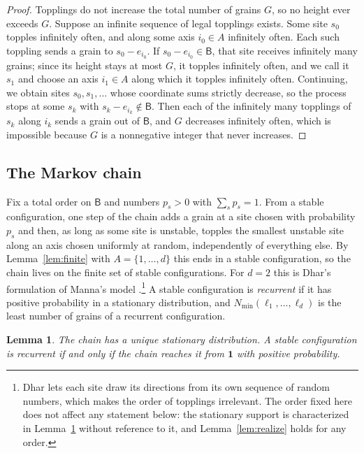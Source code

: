 \documentclass[11pt]{amsart}
\newtheorem{lemma}[theorem]{Lemma}
\theoremstyle{definition}
\newcommand{\one}{\mathbf 1}
\newcommand{\Nmin}{N_{\min}}
\newcommand{\B}{\mathsf B}
\begin{document}
\begin{proof}
Topplings do not increase the total number of grains $G$, so no height ever exceeds $G$. Suppose an infinite sequence of legal topplings exists. Some site $s_0$ topples infinitely often, and along some axis $i_0\in A$ infinitely often. Each such toppling sends a grain to $s_0-e_{i_0}$. If $s_0-e_{i_0}\in\B$, that site receives infinitely many grains; since its height stays at most $G$, it topples infinitely often, and we call it $s_1$ and choose an axis $i_1\in A$ along which it topples infinitely often. Continuing, we obtain sites $s_0,s_1,\dots$ whose coordinate sums strictly decrease, so the process stops at some $s_k$ with $s_k-e_{i_k}\notin\B$. Then each of the infinitely many topplings of $s_k$ along $i_k$ sends a grain out of $\B$, and $G$ decreases infinitely often, which is impossible because $G$ is a nonnegative integer that never increases.
\end{proof}

\subsection{The Markov chain}
Fix a total order on $\B$ and numbers $p_s>0$ with $\sum_sp_s=1$. From a stable configuration, one step of the chain adds a grain at a site chosen with probability $p_s$ and then, as long as some site is unstable, topples the smallest unstable site along an axis chosen uniformly at random, independently of everything else. By Lemma~\ref{lem:finite} with $A=\{1,\dots,d\}$ this ends in a stable configuration, so the chain lives on the finite set of stable configurations. For $d=2$ this is Dhar's formulation of Manna's model \cite[\S2]{Dha99b}.\footnote{Dhar lets each site draw its directions from its own sequence of random numbers, which makes the order of topplings irrelevant. The order fixed here does not affect any statement below: the stationary support is characterized in Lemma~\ref{lem:recurrent} without reference to it, and Lemma~\ref{lem:realize} holds for any order.} A stable configuration is \emph{recurrent} if it has positive probability in a stationary distribution, and $\Nmin(\ell_1,\dots,\ell_d)$ is the least number of grains of a recurrent configuration.

\begin{lemma}\label{lem:recurrent}
The chain has a unique stationary distribution. A stable configuration is recurrent if and only if the chain reaches it from $\one$ with positive probability.
\end{lemma}
\end{document}
